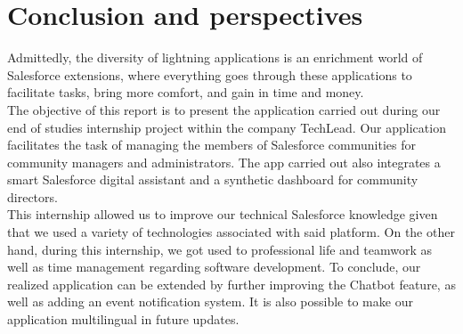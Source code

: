 
\chapter*{Conclusion and perspectives }

%
Admittedly, the diversity of lightning applications is an enrichment
world of Salesforce extensions, where everything goes through these applications
to facilitate tasks, bring more comfort, and gain in
time and money.\\
The objective of this report is to present the application carried out
during our end of studies internship project within the company TechLead. Our application facilitates the task of managing the members of Salesforce communities for community managers and administrators. The app
carried out also integrates a smart Salesforce digital assistant and a synthetic dashboard for community directors.\\
This internship allowed us to improve our technical Salesforce knowledge given
that we used a variety of technologies associated with said platform.
On the other hand, during this
internship, we got used to professional life and teamwork as well as time management regarding software development.
To conclude, our realized application can be extended by further improving the Chatbot feature, as well as adding an event notification system.
It is also possible to make our application multilingual in future updates.